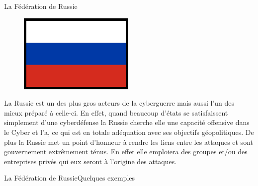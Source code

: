 \documentclass{beamer}
\begin{document}
\begin{frame}{La Fédération de Russie}

    \begin{figure}[h]
        \includegraphics[scale=0.2]{Flag_of_Russia}
    \end{figure}
    
    La Russie est un des plus gros acteurs de la cyberguerre mais aussi l'un des mieux préparé à celle-ci. En effet, quand beaucoup d'états se satisfaissent simplement d'une cyberdéfense la Russie cherche elle une capacité offensive dans le Cyber et l'a, ce qui est en totale adéquation avec ses objectifs géopolitiques. De plus la Russie met un point d'honneur à rendre les liens entre les attaques et sont gouvernement extrêmement ténus. En effet elle emploiera des groupes et/ou des entreprises privés qui eux seront à l'origine des attaques.

\end{frame}

\begin{frame}{La Fédération de Russie}{Quelques exemples}


    
\end{frame}
\end{document}
